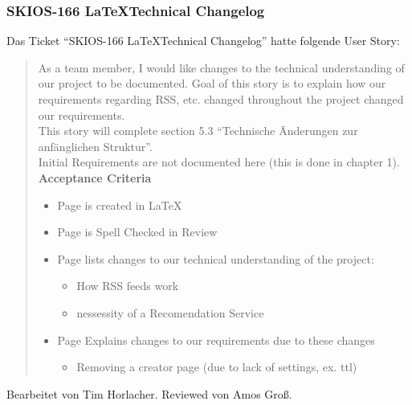 \subsubsection{SKIOS-166 \LaTeX Technical Changelog}
Das Ticket \enquote{SKIOS-166 \LaTeX Technical Changelog} hatte folgende User Story:
\begin{quotation}
    As a team member, I would like changes to the technical understanding of our project to be documented.
    Goal of this story is to explain how our requirements regarding RSS, etc. changed throughout the project changed our requirements. \\
    This story will complete section 5.3 “Technische Änderungen zur anfänglichen Struktur”. \\
    Initial Requirements are not documented here (this is done in chapter 1).
\textbf{Acceptance Criteria}
\begin{itemize}
    \item Page is created in LaTeX
    \item Page is Spell Checked in Review
    \item Page lists changes to our technical understanding of the project:
    \begin{itemize}
        \item How RSS feeds work
        \item nessessity of a Recomendation Service
    \end{itemize}
    \item Page Explains changes to our requirements due to these changes
    \begin{itemize}
        \item Removing a creator page (due to lack of settings, ex. ttl)
    \end{itemize}
\end{itemize}
\end{quotation}
Bearbeitet von Tim Horlacher.
Reviewed von Amos Groß.

